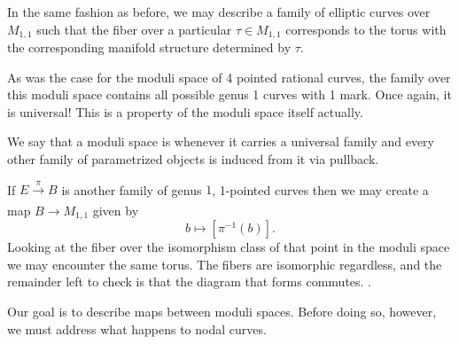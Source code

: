 
In the same fashion as before, we may describe a family of elliptic curves over $M_{1,1}$ such that the fiber over a particular $\tau\in M_{1,1}$ corresponds to the torus with the corresponding manifold structure determined by $\tau$.\par
As was the case for the moduli space of 4 pointed rational curves, the family over this moduli space contains all possible genus 1 curves with 1 mark. Once again, it is universal! This is a property of the moduli space itself actually.

\begin{Def}
    We say that a moduli space is  whenever it carries a universal family and every other family of parametrized objects is induced from it via pullback. 
\end{Def}

\begin{Ex}
    If $E\xrightarrow[]{\pi}B$ is another family of genus $1$, 1-pointed curves then we may create a map $B\to M_{1,1}$ given by 
    $$b\mapsto[\pi^{-1}(b)].$$
    Looking at the fiber over the isomorphism class of that point in the moduli space we may encounter the same torus. The fibers are isomorphic regardless, and the remainder left to check is that the diagram that forms commutes. .
\end{Ex}

Our goal is to describe maps between moduli spaces. Before doing so, however, we must address what happens to nodal curves.